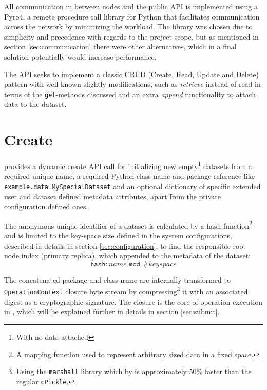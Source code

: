 All communication in \CodeName between nodes and the public API is implemented using a Pyro4\cite{PagePyro4}, a remote procedure call library for Python that facilitates communication across the network by minimizing the workload. The library was chosen due to simplicity and precedence with regards to the project scope, but as mentioned in section \ref{sec:communication} there were other alternatives, which in a final solution potentially would increase performance.
\newline

The API seeks to implement a classic CRUD (Create, Read, Update and Delete) pattern with well-known slightly modifications, such as \textit{retrieve} instead of read in terms of the \texttt{get}-methods discussed and an extra \textit{append} functionality to attach data to the dataset.

\section{Create} \label{sec:api-create}
\CodeName provides a dynamic create API call for initializing new empty\footnote{With no data attached} datasets from a required unique name, a required Python class name and package reference like \texttt{example.data.MySpecialDataset} and an optional dictionary of specific extended user and dataset defined metadata attributes, apart from the private configuration \CodeName defined ones.
\newline

The anonymous unique identifier of a dataset is calculated by a hash function\footnote{A mapping function used to represent arbitrary sized data in a fixed space.} and is limited to the key-space size defined in the system configurations, described in details in section \ref{sec:configuration}, to find the responsible root node index (primary replica), which appended to the metadata of the dataset:
\begin{equation}
	\texttt{hash}:name \texttt{ mod } \texttt{\#}keyspace
\end{equation}

The concatenated package and class name are internally transformed to \CodeName \texttt{OperationContext} closure byte stream by compressing\footnote{Using the \texttt{marshall} \cite{PageMarshall} library which by \cite{Brody2015} is approximately 50\% faster than the regular \texttt{cPickle}.} it with an associated digest as a cryptographic signature. The closure is the core of operation execution in \CodeName, which will be explained further in details in section \ref{sec:submit}.

